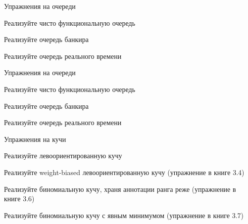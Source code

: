 \begin{frame}[allowframebreaks]{Упражнения на очереди}
\begin{exercise}[\exscore{?}{?}{?}]
Реализуйте чисто функциональную очередь
\end{exercise}

\begin{exercise}[\exscore{?}{?}{?}]
Реализуйте очередь банкира
\end{exercise}

\begin{exercise}[\exscore{?}{?}{?}]
Реализуйте очередь реального времени
\end{exercise}
\end{frame}



\begin{frame}[allowframebreaks]{Упражнения на очереди}
\begin{exercise}[\exscore{?}{?}{?}]
Реализуйте чисто функциональную очередь
\end{exercise}

\begin{exercise}[\exscore{?}{?}{?}]
Реализуйте очередь банкира
\end{exercise}

\begin{exercise}[\exscore{?}{?}{?}]
Реализуйте очередь реального времени
\end{exercise}
\end{frame}



\begin{frame}[allowframebreaks]{Упражнения на кучи}
\begin{exercise}[\exscore{?}{?}{?}]
Реализуйте левоориентированную кучу
\end{exercise}

\begin{exercise}[\exscore{?}{?}{?}]
Реализуйте weight-biased левоориентированную кучу (упражнение в книге 3.4)
\end{exercise}


\begin{exercise}[\exscore{?}{?}{?}]
Реализуйте биномиальную кучу, храня аннотации ранга реже (упражнение в книге 3.6)
\end{exercise}

\begin{exercise}[\exscore{?}{?}{?}]
Реализуйте биномиальную кучу с явным минимумом (упражнение в книге 3.7)
\end{exercise}

\end{frame}


